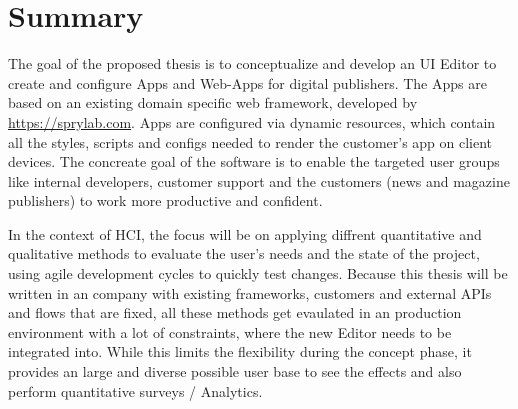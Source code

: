 \section*{Summary}
The goal of the proposed thesis is to conceptualize and develop an UI Editor to create and configure Apps and Web-Apps for digital publishers.
The Apps are based on an existing domain specific web framework, developed by \url{https://sprylab.com}.
Apps are configured via dynamic resources, which contain all the styles, scripts and configs needed to render the customer's app on client devices.
The concreate goal of the software is to enable the targeted user groups like internal developers,
customer support and the customers (news and magazine publishers) to work more productive and confident.

In the context of HCI, the focus will be on applying diffrent quantitative and qualitative methods to evaluate the user's needs and the state of the project, using agile development cycles to quickly test changes.
Because this thesis will be written in an company with existing frameworks, customers and external APIs and flows that are fixed, all these methods get evaulated in an production environment with a lot of constraints, where the new Editor needs to be integrated into.
While this limits the flexibility during the concept phase, it provides an large and diverse possible user base to see the effects and also perform quantitative surveys / Analytics.
